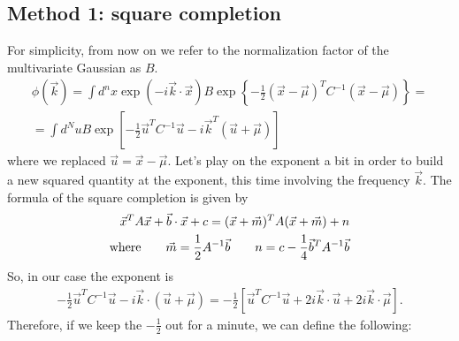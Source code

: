 \documentclass[a4paper,11pt,fleqn]{article}
\begin{document}
\subsection{Method 1: square completion}
For simplicity, from now on we refer to the normalization factor of the multivariate Gaussian as $B$.
\begin{gather*}
    \phi(\vec{k}) = \int d^nx \exp{(-i\vec{k}\cdot \vec{x}) B \exp{\left\{-\frac{1}{2}(\vec{x}-\vec{\mu})^T C^{-1} (\vec{x}-\vec{\mu})\right\}}} = \\
    = \int d^N u B \exp{\left[ -\frac{1}{2}\vec{u}^TC^{-1}\vec{u} - i\vec{k}^T(\vec{u}+\vec{\mu}) \right]}
\end{gather*}
where we replaced $\vec{u} = \vec{x}-\vec{\mu}$. Let's play on the exponent a bit in order to build a new squared
quantity at the exponent, this time involving the frequency $\vec{k}$. The formula of the square completion is given by
\begin{align}
    \label{eqn:square_completion}
    \vec{x}^T A \vec{x} + \vec{b}\cdot \vec{x} + c = (\vec{x}+\vec{m})^TA(\vec{x}+\vec{m})+n \\
    \textnormal{where} \qquad \vec{m} = \frac{1}{2}A^{-1}\vec{b} \qquad n = c -\frac{1}{4}\vec{b}^TA^{-1}\vec{b}
\end{align}
So, in our case the exponent is
\begin{gather*}
   -\frac{1}{2}\vec{u}^T C^{-1}\vec{u} - i\vec{k} \cdot (\vec{u}+\vec{\mu}) = -\frac{1}{2}\left[\vec{u}^TC^{-1}\vec{u} +2 i \vec{k}\cdot \vec{u} +2i \vec{k}\cdot \vec{\mu}\right].
\end{gather*}
Therefore, if we keep the $-\frac{1}{2}$ out for a minute, we can define the following:
\end{document}

